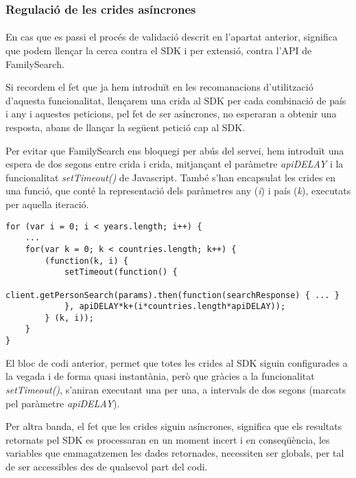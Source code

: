 \subsubsection{Regulació de les crides asíncrones}

\paragraph{}
En cas que es passi el procés de validació descrit en l'apartat anterior, significa que podem llençar la cerca contra el SDK i per extensió, contra l’API de FamilySearch.

Si recordem el fet que ja hem introduït en les recomanacions d’utilització d’aques\-ta funcionalitat, llençarem una crida al SDK per cada combinació de país i any i aques\-tes peticions, pel fet de ser asíncrones, no esperaran a obtenir una resposta, abans de llançar la següent petició cap al SDK.

Per evitar que FamilySearch ens bloquegi per abús del servei, hem introduït una espera de dos segons entre crida i crida, mitjançant el paràmetre \emph{apiDELAY} i la funcionalitat \emph{setTimeout()} de Javascript. També s'han encapsulat les crides en una funció, que conté la representació dels paràmetres any (\emph{i}) i país (\emph{k}), executats per aquella iteració.

\begin{lstlisting}[style=rawOwn,caption={Separació manual de les crides asíncrones al SDK}]
for (var i = 0; i < years.length; i++) {
    ...
    for(var k = 0; k < countries.length; k++) {
        (function(k, i) {
            setTimeout(function() {
                client.getPersonSearch(params).then(function(searchResponse) { ... }
            }, apiDELAY*k+(i*countries.length*apiDELAY));
        } (k, i));
    }
}
\end{lstlisting}

El bloc de codi anterior, permet que totes les crides al SDK siguin configurades a la vegada i de forma quasi instantània, però que gràcies a la funcionalitat \emph{setTimeout()}, s'aniran executant una per una, a intervals de dos segons (marcats pel paràmetre \emph{apiDELAY}).

Per altra banda, el fet que les crides siguin asíncrones, significa que els resultats retornats pel SDK es processaran en un moment incert i en conseqüència, les varia\-bles que emmagatzemen les dades retornades, necessiten ser globals, per tal de ser accessibles des de qualsevol part del codi.


